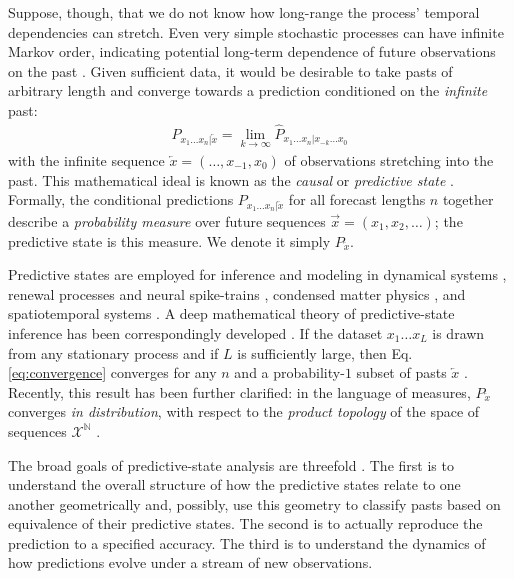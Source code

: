 \documentclass[draft,aps,pre,twocolumn,groupaddress,showkeys,nofootinbib,preprintnumbers,floatfix]{revtex4-2}
\begin{document}
Suppose, though, that we do not know how long-range the process' temporal
dependencies can stretch. Even very simple stochastic processes can have
infinite Markov order, indicating potential long-term dependence of future
observations on the past \cite{Uppe97a}. Given sufficient data, it would be
desirable to take pasts of arbitrary length and converge towards a prediction
conditioned on the \emph{infinite} past:
\begin{align}
  {P}_{x_{1}\dots x_{n}|\overleftarrow{x}}
  = \lim_{k\rightarrow\infty}
  \widehat{P}_{x_{1}\dots x_{n}|x_{-k}\dots x_0}
\label{eq:convergence}
\end{align}
with the infinite sequence $\overleftarrow{x} = (\dots,x_{-1},x_0)$ of
observations stretching into the past. This mathematical ideal is known as the
\emph{causal} or \emph{predictive state} \cite{Crut88a,Jaeg00a}. Formally, the
conditional predictions ${P}_{x_{1}\dots x_{n}|\overleftarrow{x}}$ for all
forecast lengths $n$ together describe a \emph{probability measure} over future
sequences $\overrightarrow{x} = (x_1,x_2,\dots)$; the predictive state is this
measure. We denote it simply $P_{\overleftarrow{x}}$.

Predictive states are employed for inference and modeling in dynamical systems
\cite{Crut92c}, renewal processes and neural spike-trains
\cite{Marz14e,Marz15a}, condensed matter physics \cite{Varn14a}, and
spatiotemporal systems \cite{Rupe19b}. A deep mathematical
theory of predictive-state inference has been correspondingly developed
\cite{Uppe97a,Jaeg00a,Shal02a,Jame04a,Stil07b,Stre13a,Thon15a,Brod20a}.
If the dataset $x_1 \dots x_L$ is drawn from any stationary process and if $L$
is sufficiently large, then Eq. \eqref{eq:convergence} converges for any $n$
and a probability-$1$ subset of pasts $\overleftarrow{x}$ \cite{Uppe97a}.
Recently, this result has been further clarified: in the language of measures,
$P_{\overleftarrow{x}}$ converges \emph{in distribution}, with respect to the
\emph{product topology} of the space of sequences $\mathcal{X}^\mathbb{N}$
\cite{Loom21a}.

The broad goals of predictive-state analysis are threefold \cite{Shal98a}. The
first is to understand the overall structure of how the predictive states
relate to one another geometrically and, possibly, use this geometry to
classify pasts based on equivalence of their predictive states. The second is
to actually reproduce the prediction to a specified accuracy. The third is to
understand the dynamics of how predictions evolve under a stream of new
observations. 
\end{document}
